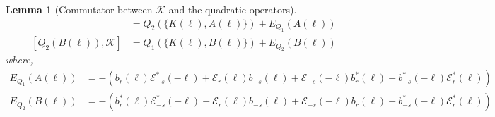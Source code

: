 \documentclass[sn-mathphys,Numbered, a4paper ,nocrop]{sn-jnl}%
\theoremstyle{plain}
\newtheorem{lemma}[theorem]{Lemma}
\theoremstyle{definition}
\theoremstyle{remark}
\theoremstyle{plain}
\theoremstyle{definition}
\theoremstyle{remark}
\begin{document}
\begin{lemma}[Commutator between $\mathcal{K} $ and the quadratic operators]
\begin{align}
    [ Q_1(A(\ell)),\mathcal{K}] &= Q_2(\{K(\ell),A(\ell)\}) + E_{Q_1}(A(\ell)) \\
    [ Q_2(B(\ell)),\mathcal{K}] &= Q_1(\{K(\ell),B(\ell)\}) + E_{Q_2}(B(\ell))
\end{align}
 where,
\begin{align}
     E_{Q_1}(A(\ell))&=-\left( b_r(\ell)\mathcal{E}^*_{-s}(-\ell)+\mathcal{E}_{r}(\ell)b_{-s}(\ell) + \mathcal{E}_{-s}(-\ell)b^*_{r}(\ell) + b^*_{-s}(-\ell)\mathcal{E}^*_{r}(\ell) \right)\\
     E_{Q_2}(B(\ell))&=-\left( b^*_r(\ell)\mathcal{E}^*_{-s}(-\ell)+\mathcal{E}_{r}(\ell)b_{-s}(\ell) + \mathcal{E}_{-s}(-\ell)b_{r}(\ell) + b^*_{-s}(-\ell)\mathcal{E}^*_{r}(\ell) \right)
\end{align}
\end{lemma}
\end{document}

